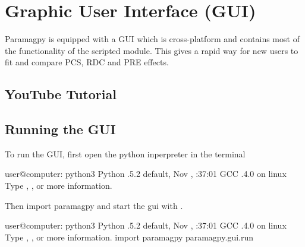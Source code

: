 \documentclass[a4paper,10pt,english,openany,oneside]{sphinxmanual}
\begin{document}
\noindent{}


\section{Graphic User Interface (GUI)}
\label{\detokenize{paramagpy_gui:graphic-user-interface-gui}}\label{\detokenize{paramagpy_gui:paramagpy-gui}}\label{\detokenize{paramagpy_gui::doc}}
Paramagpy is equipped with a GUI which is cross-platform and contains most of the functionality of the scripted module. This gives a rapid way for new users to fit and compare PCS, RDC and PRE effects.


\subsection{YouTube Tutorial}
\label{\detokenize{paramagpy_gui:youtube-tutorial}}




\subsection{Running the GUI}
\label{\detokenize{paramagpy_gui:running-the-gui}}
To run the GUI, first open the python inperpreter in the terminal

%
\begin{sphinxVerbatim}[commandchars=\\\{\}]
user@computer:\PYGZti{}\PYGZdl{} python3
Python .5.2 default, Nov  , :37:01
\PYG{o}{[}GCC .4.0 \PYG{o}{]} on linux
Type , ,  or   more information.
\PYGZgt{}\PYGZgt{}\PYGZgt{}
\end{sphinxVerbatim}

Then import paramagpy and start the gui with .

%
\begin{sphinxVerbatim}[commandchars=\\\{\}]
user@computer:\PYGZti{}\PYGZdl{} python3
Python .5.2 default, Nov  , :37:01
\PYG{o}{[}GCC .4.0 \PYG{o}{]} on linux
Type , ,  or   more information.
\PYGZgt{}\PYGZgt{}\PYGZgt{} import paramagpy
\PYGZgt{}\PYGZgt{}\PYGZgt{} paramagpy.gui.run
\end{sphinxVerbatim}
\end{document}
